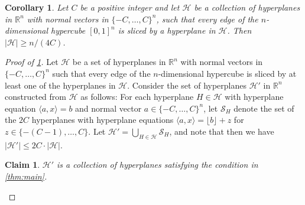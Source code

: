 \documentclass[10pt,a4paper]{amsart}
\newtheorem{corollary}{Corollary}
\newtheorem{claim}{Claim}
\newcommand{\ang}[1]{\langle#1\rangle}
\newcommand{\cH}{\mathcal H}
\newcommand{\cS}{\mathcal S}
\newcommand{\floor}[1]{\lfloor#1\rfloor}
\renewcommand{\ge}{\geqslant}
\renewcommand{\le}{\leqslant}
\begin{document}
\begin{corollary}\label{cor:slicing}
    Let $C$ be a positive integer and let $\cH $ be a collection of hyperplanes in $\mathbb{R}^n$ with normal vectors in $\{-C, \dots, C\}^n$, such that every edge of the $n$-dimensional hypercube $[0,1]^n$ is sliced by a hyperplane in $\cH$. Then $|\cH|\ge n/(4C)$.
\end{corollary}

\begin{proof}[Proof of \cref{cor:slicing}]
Let $\cH$ be a set of hyperplanes in $\mathbb{R}^n$ with normal vectors in $\{-C,\dots, C\}^n$ such that every edge of the $n$-dimensional hypercube is sliced by at least one of the hyperplanes in $\cH$. Consider the set of hyperplanes $\cH'$ in $\mathbb{R}^n$ constructed from $\cH$ as follows: For each hyperplane $H\in \cH$ with hyperplane equation $\ang{a,x} = b $ and normal vector $a\in \{-C,\dots, C\}^n$, let $\cS_H$ denote the set of the $2C$ hyperplanes with hyperplane equations $\ang{a,x} = \floor{b} + z$ for $z\in \{-(C-1),\dots, C\}$. Let $\cH' = \bigcup_{H\in \cH} \cS_H$, and note that then we have $|\cH'| \le 2C\cdot |\cH|$.



\begin{claim}\label{claim:reduction}
    $\cH'$ is a collection of hyperplanes satisfying the condition in \cref{thm:main}.
\end{claim}


\end{proof}
\end{document}
